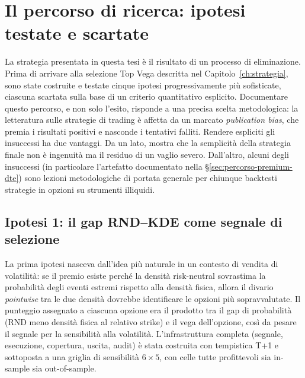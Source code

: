 \chapter{Il percorso di ricerca: ipotesi testate e scartate}
\label{ch:percorso}

La strategia presentata in questa tesi è il risultato di un processo di
eliminazione. Prima di arrivare alla selezione Top Vega descritta nel
Capitolo~\ref{ch:strategia}, sono state costruite e testate cinque ipotesi
progressivamente più sofisticate, ciascuna scartata sulla base di un
criterio quantitativo esplicito. Documentare questo percorso, e non solo
l'esito, risponde a una precisa scelta metodologica: la letteratura sulle
strategie di trading è affetta da un marcato \emph{publication bias}, che
premia i risultati positivi e nasconde i tentativi falliti. Rendere
espliciti gli insuccessi ha due vantaggi. Da un lato, mostra che la
semplicità della strategia finale non è ingenuità ma il residuo di un
vaglio severo. Dall'altro, alcuni degli insuccessi (in particolare
l'artefatto documentato nella \S\ref{sec:percorso-premium-dte}) sono
lezioni metodologiche di portata generale per chiunque backtesti strategie
in opzioni su strumenti illiquidi.

\section{Ipotesi 1: il gap RND--KDE come segnale di selezione}
\label{sec:percorso-rnd-kde}

La prima ipotesi nasceva dall'idea più naturale in un contesto di vendita
di volatilità: se il premio esiste perché la densità risk-neutral
sovrastima la probabilità degli eventi estremi rispetto alla densità
fisica, allora il divario \emph{pointwise} tra le due densità dovrebbe
identificare le opzioni più sopravvalutate. Il punteggio assegnato a
ciascuna opzione era il prodotto tra il gap di probabilità (RND meno densità
fisica al relativo strike) e il vega dell'opzione, così da pesare il segnale
per la sensibilità alla volatilità. L'infrastruttura completa (segnale,
esecuzione, copertura, uscita, audit) è stata costruita con tempistica T+1 e
sottoposta a una griglia di sensibilità $6\times 5$, con celle tutte
profittevoli sia in-sample sia out-of-sample.

